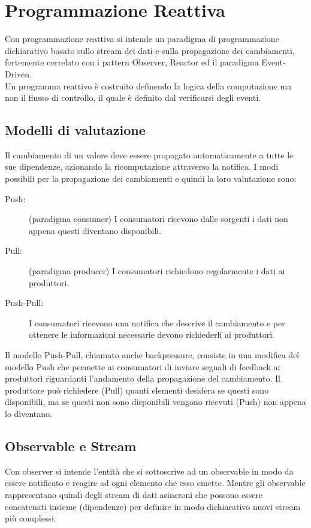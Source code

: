 \documentclass[../main.tex]{subfiles}
\begin{document}
\section{Programmazione Reattiva}
Con programmazione reattiva si intende un paradigma di programmazione dichiarativo basato sullo stream dei dati e sulla propagazione dei cambiamenti, fortemente correlato con i pattern Observer, Reactor ed il paradigma Event-Driven.\\
Un programma reattivo è costruito definendo la logica della computazione ma non il flusso di controllo, il quale è definito dal verificarsi degli eventi.\\

\subsection{Modelli di valutazione}
Il cambiamento di un valore deve essere propagato automaticamente a tutte le sue dipendenze, azionando la ricomputazione attraverso la notifica. I modi possibili per la propagazione dei cambiamenti e quindi la loro valutazione sono:
\begin{description}
    \item[Push:] (paradigma consumer) I consumatori ricevono dalle sorgenti i dati non appena questi diventano disponibili. 
    \item[Pull:] (paradigma producer) I consumatori richiedono regolarmente i dati ai produttori.
    \item[Push-Pull:] I consumatori ricevono una notifica che descrive il cambiamento e per ottenere le informazioni necessarie devono richiederli ai produttori.
\end{description}
Il modello Push-Pull, chiamato anche backpressure, consiste in una modifica del modello Push che permette ai consumatori di inviare segnali di feedback ai produttori riguardanti l'andamento della propagazione del cambiamento. Il produttore può richiedere (Pull) quanti elementi desidera se questi sono disponibili, ma se questi non sono disponibili vengono ricevuti (Push) non appena lo diventano.\\

\subsection{Observable e Stream}
Con observer si intende l'entità che si sottoscrive ad un observable in modo da essere notificato e reagire ad ogni elemento che esso emette. Mentre gli observable rappresentano quindi degli stream di dati asincroni che possono essere concatenati insieme (dipendenze) per definire in modo dichiarativo nuovi stream più complessi.\\
\end{document}
